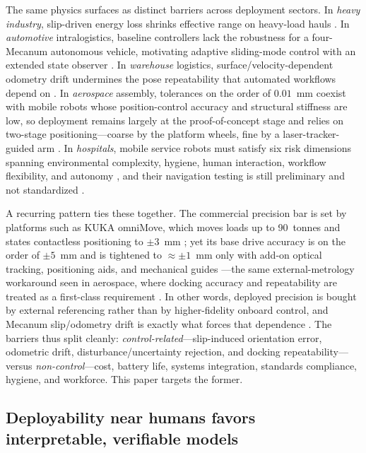 \documentclass[11pt]{article}
\begin{document}
The same physics surfaces as distinct barriers across deployment sectors.
In \emph{heavy industry}, slip-driven energy loss shrinks effective range on
heavy-load hauls \cite{bayar2025battery}. In \emph{automotive} intralogistics,
baseline controllers lack the robustness for a four-Mecanum autonomous vehicle,
motivating adaptive sliding-mode control with an extended state observer
\cite{bui2025hybrid}. In \emph{warehouse} logistics, surface/velocity-dependent
odometry drift undermines the pose repeatability that automated workflows depend on
\cite{shahidi2021odometry}. In \emph{aerospace} assembly, tolerances on the order
of $0.01$~mm coexist with mobile robots whose position-control accuracy and
structural stiffness are low, so deployment remains largely at the proof-of-concept
stage and relies on two-stage positioning---coarse by the platform wheels, fine by a
laser-tracker-guided arm \cite{aerospaceassembly2026}. In \emph{hospitals}, mobile
service robots must satisfy six risk dimensions spanning environmental complexity,
hygiene, human interaction, workflow flexibility, and autonomy
\cite{hospitalrisks2024}, and their navigation testing is still preliminary and not
standardized \cite{hospitalnavbench2024}.

A recurring pattern ties these together. The commercial precision bar is set by
platforms such as KUKA omniMove, which moves loads up to 90~tonnes and states
contactless positioning to $\pm3$~mm \cite{kuka_omnimove}; yet its base drive
accuracy is on the order of $\pm5$~mm and is tightened to $\approx\pm1$~mm only with
add-on optical tracking, positioning aids, and mechanical guides
\cite{kuka_aerospace}---the same external-metrology workaround seen in aerospace,
where docking accuracy and repeatability are treated as a first-class requirement
\cite{nist2016docking}. In other words, deployed precision is bought by external
referencing rather than by higher-fidelity onboard control, and Mecanum
slip/odometry drift is exactly what forces that dependence
\cite{shahidi2021odometry,adamov2018youbot}. The barriers thus split cleanly:
\emph{control-related}---slip-induced orientation error, odometric drift,
disturbance/uncertainty rejection, and docking repeatability---versus
\emph{non-control}---cost, battery life, systems integration, standards compliance,
hygiene, and workforce. This paper targets the former.

\subsection{Deployability near humans favors interpretable, verifiable models}
\label{sec:certifiability}
\end{document}
